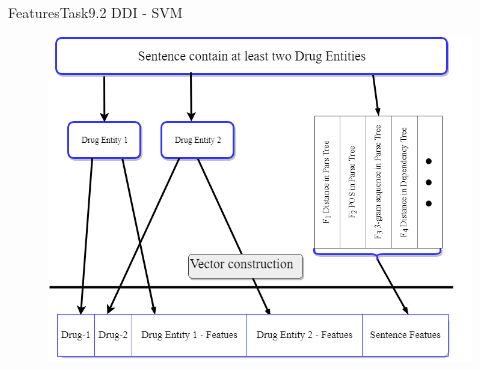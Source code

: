 \documentclass[xcolor=table]{beamer}
\begin{document}


\begin{frame}{Features}{Task9.2 DDI - SVM}
\begin{figure}
\includegraphics[scale=0.3]{DDI.png}
\end{figure}
\end{frame}


\end{document}
